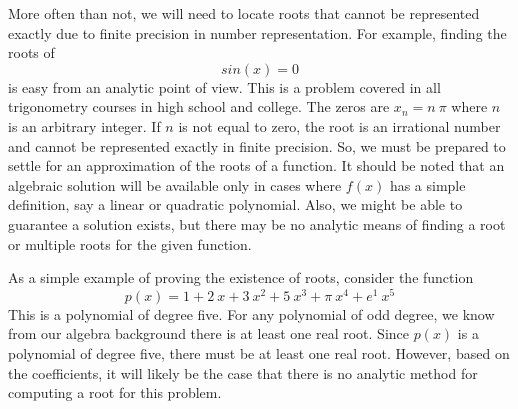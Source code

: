 \documentclass[10pt,fleqn]{article}
\begin{document}
More often than not, we will need to locate roots that cannot be represented
exactly due to finite precision in number representation. For example, finding
the roots of
$$
  sin(x)=0
$$
is easy from an analytic point of view. This is a problem covered in all
trigonometry courses in high school and college. The zeros are $x_n=n\ \pi$
where $n$ is an arbitrary integer. If $n$ is not equal to zero, the root is an
irrational number and cannot be represented exactly in finite precision. So, we
must be prepared to settle for an approximation of the roots of a function. It
should be noted that an algebraic solution will be available only in cases where
$f(x)$ has a simple definition, say a linear or quadratic polynomial. Also, we
might be able to guarantee a solution exists, but there may be no analytic means
of finding a root or multiple roots for the given function.

As a simple example of proving the existence of roots, consider the function
\[
  p(x) = 1 + 2\ x + 3\ x^2 + 5\ x^3 + \pi\ x^4 + e^{1}\ x^5
\]
This is a polynomial of degree five. For any polynomial of odd degree, we know
from our algebra background there is at least one real root. Since $p(x)$ is a
polynomial of degree five, there must be at least one real root. However, based
on the coefficients, it will likely be the case that there is no analytic method
for computing a root for this problem.
\end{document}
